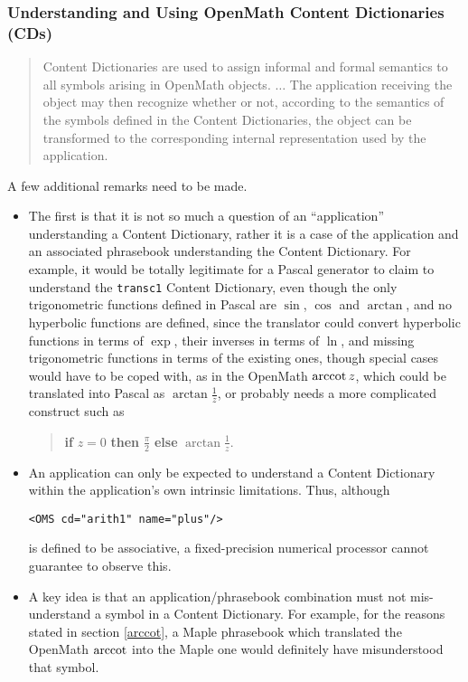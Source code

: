 \documentclass[report,keylogo]{openmath}
\begin{document}
\subsubsection{Understanding and Using OpenMath Content Dictionaries (CDs)}

\begin{quotation}
  Content Dictionaries are used to assign informal and formal semantics
  to all symbols arising in OpenMath objects. $\ldots$ The application
  receiving the object may then recognize whether or not, according to
  the semantics of the symbols defined in the Content Dictionaries,
  the object can be transformed to the corresponding internal
  representation used by the application.  \cite{OMstd}
\end{quotation}

A few additional remarks need to be made.
\begin{itemize}
\item The first is that it is not so much a question of an
  ``application'' understanding a Content Dictionary, rather it is a
  case of the application and an associated phrasebook understanding
  the Content Dictionary. For example, it would be totally legitimate
  for a Pascal generator to claim to understand the {\tt transc1}
  Content Dictionary, even though the only trigonometric functions
  defined in Pascal \cite{IEEEPascal} are $\sin$, $\cos$ and
  $\arctan$, and no hyperbolic functions are defined, since the
  translator could convert hyperbolic functions in terms of $\exp$,
  their inverses in terms of $\ln$, and missing trigonometric
  functions in terms of the existing ones, though special cases would
  have to be coped with, as in the OpenMath $\mathop{\rm arccot} z$, which could
  be translated into Pascal as $\arctan\frac1z$, or probably needs a
  more complicated construct such as
\begin{quote}
  {\bf if} $z=0$ {\bf then} $\frac\pi2$ {\bf else} $\arctan\frac1z$.
\end{quote}
\item An application can only be expected to understand a Content
  Dictionary within the application's own intrinsic limitations. Thus,
  although
\begin{verbatim}
<OMS cd="arith1" name="plus"/>
\end{verbatim}
  is defined to be associative, a fixed-precision numerical processor
  cannot guarantee to observe this.
\item A key idea is that an application/phrasebook combination must
  not mis-understand a symbol in a Content Dictionary. For example,
  for the reasons stated in section \ref{arccot}, a Maple phrasebook
  which translated the OpenMath $\mathop{\rm arccot}$ into the Maple one would
  definitely have misunderstood that symbol.
\end{itemize}
\end{document}
